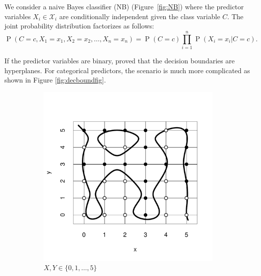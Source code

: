 \documentclass[11pt,a4paper, twoside]{book}
\newcommand{\Pp}{\operatorname{P}}
\newcommand{\nchi}{\mathcal{X}}
\begin{document}
We consider a naive Bayes classifier (NB) (Figure~\ref{fig:NB}) where the predictor variables $X_i\in \nchi_i$ are conditionally independent given the class variable $C$. The joint probability distribution factorizes as follows:
\begin{equation}
\Pp(C=c,X_1=x_1,X_2=x_2,\ldots , X_n=x_n)=\Pp(C=c)\prod_{i=1}^{n}{\Pp(X_i=x_i|C=c)} .
\label{eq:fact NB}
\end{equation}

If the predictor variables are binary, \citet{Minsky61stepstoward} proved that the decision boundaries are hyperplanes. For categorical predictors, the scenario is much more complicated as shown in Figure \ref{fig:decboundfig}.
\begin{figure}[h]
\begin{subfigure}[b]{0.45\textwidth}
\includegraphics[scale=0.4]{nb1}
\caption{ $X,Y \in \{0,1,\ldots,5\}$} 
\end{subfigure}
\begin{subfigure}[b]{0.45\textwidth}

\end{subfigure}
\end{figure}
\end{document}
